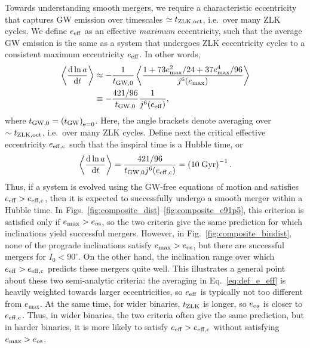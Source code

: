 \documentclass[
        fleqn,
        usenatbib,
    ]{mnras}
\newcommand*{\rd}[2]{\frac{\mathrm{d}#1}{\mathrm{d}#2}}
\newcommand*{\ev}[1]{\left\langle#1\right\rangle}
\newcommand*{\p}[1]{\left(#1\right)}
\begin{document}
Towards understanding smooth mergers, we require a characteristic eccentricity
that captures GW emission over timescales $\simeq t_{\rm ZLK, oct}$, i.e.\ over
many ZLK cycles. We define $e_{\rm eff}$ as an effective \emph{maximum}
eccentricity, such that the average GW emission is the same as a system that
undergoes ZLK eccentricity cycles to a consistent maximum eccentricity $e_{\rm
eff}$. In other words,
\begin{align}
    \ev{\rd{\ln a}{t}} &\approx -\frac{1}{t_{\rm GW, 0}}
            \ev{\frac{1 + 73e_{\max}^2/24 + 37e_{\max}^4/96}
                {j^6(e_{\max})}}\nonumber\\
        &\equiv -\frac{421/96}{t_{\rm GW, 0}}\frac{1}{j^6(e_{\rm eff})},
        \label{eq:def_e_eff}
\end{align}
where $t_{\rm GW, 0} = \p{t_{\rm GW}}_{\rm e = 0}$. Here, the angle brackets
denote averaging over $\sim t_{\rm ZLK, oct}$, i.e.\ over many ZLK cycles.
Define next the critical effective eccentricity $e_{\rm eff, c}$ such that the
inspiral time is a Hubble time, or
\begin{equation}
    \ev{\rd{\ln a}{t}} = \frac{421/96}{t_{\rm GW, 0}j^6(e_{\rm eff, c})}
        = \p{10\;\mathrm{Gyr}}^{-1}. \label{eq:def_e_eff_c}
\end{equation}
Thus, if a system is evolved using the GW-free equations of motion and satisfies
$e_{\rm eff} > e_{\rm eff, c}$, then it is expected to successfully undergo a
smooth merger within a Hubble time. In
Figs.~\ref{fig:composite_dist}--\ref{fig:composite_e91p5}, this criterion is
satisfied only if $e_{\max} > e_{\rm os}$, so the two criteria give the same
prediction for which inclinations yield successful mergers. However, in
Fig.~\ref{fig:composite_bindist}, none of the prograde inclinations satisfy
$e_{\max} > e_{\rm os}$, but there are successful mergers for $I_0 < 90^\circ$.
On the other hand, the inclination range over which $e_{\rm eff} > e_{\rm eff,
c}$ predicts these mergers quite well. This illustrates a general point about
these two semi-analytic criteria: the averaging in Eq.~\eqref{eq:def_e_eff} is
heavily weighted towards larger eccentricities, so $e_{\rm eff}$ is typically
not too different from $e_{\max}$. At the same time, for wider binaries, $t_{\rm
ZLK}$ is longer, so $e_{\rm os}$ is closer to $e_{\rm eff, c}$. Thus, in wider
binaries, the two criteria often give the same prediction, but in harder
binaries, it is more likely to satisfy $e_{\rm eff} > e_{\rm eff, c}$ without
satisfying $e_{\max} > e_{\rm os}$.
\end{document}
